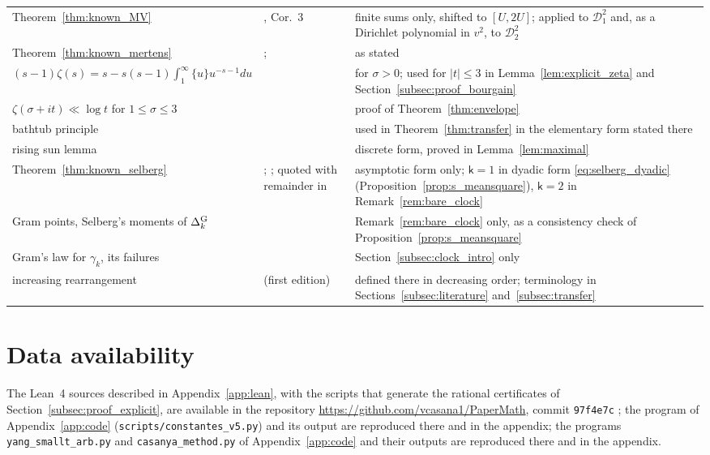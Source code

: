 \documentclass[11pt,a4paper]{article}
\makeatletter
\numberwithin{equation}{section}
\DeclareRobustCommand{\CGref}[1]{\ref{#1}}
\DeclareRobustCommand{\CGeqref}[1]{\eqref{#1}}
\DeclareRobustCommand{\CGcite}[2][]{\if\relax\detokenize{#1}\relax\cite{#2}\else\cite[#1]{#2}\fi}
\let\CG@origref\ref
\let\CG@origeqref\eqref
\newcommand{\CG@gettip}[1]{\@ifundefined{CGTip@#1}{#1}{\csname CGTip@#1\endcsname}}
\newcommand{\CG@getbib}[1]{\@ifundefined{CGBib@#1}{#1}{\csname CGBib@#1\endcsname}}
\DeclareRobustCommand{\CGref}[1]{\pdftooltip{\CG@origref{#1}}{\CG@gettip{#1}}}
\DeclareRobustCommand{\CGeqref}[1]{\pdftooltip{\CG@origeqref{#1}}{\CG@gettip{#1}}}
\DeclareRobustCommand{\CGcite}[2][]{\pdftooltip{\if\relax\detokenize{#1}\relax\cite{#2}\else\cite[#1]{#2}\fi}{\CG@getbib{#2}}}
\theoremstyle{definition}
\theoremstyle{remark}
\makeatother
\begin{document}
\begin{center}
\begin{longtable}{p{}p{}p{}}
Theorem~\CGref{thm:known_MV} & \CGcite{MontgomeryVaughan1974}, Cor.~3 & finite sums only, shifted to $[U,2U]$; applied to $\mathscr D_1^2$ and, as a Dirichlet polynomial in $v^2$, to $\mathscr D_2^2$\\
Theorem~\CGref{thm:known_mertens} & \CGcite{Mertens1874}; \CGcite[Ch.~I.1]{Tenenbaum2015} & as stated\\
$(s-1)\zeta(s)=s-s(s-1)\int_1^\infty\{u\}u^{-s-1}du$ & \CGcite[(2.1.4)]{Titchmarsh1986} & for $\sigma>0$; used for $|t|\le3$ in Lemma~\CGref{lem:explicit_zeta} and Section~\CGref{subsec:proof_bourgain}\\
$\zeta(\sigma+it)\ll\log t$ for $1\le\sigma\le3$ & \CGcite[Thm.~3.5]{Titchmarsh1986} & proof of Theorem~\CGref{thm:envelope}\\
bathtub principle & \CGcite[Thm.~1.14]{LiebLoss2001} & used in Theorem~\CGref{thm:transfer} in the elementary form stated there\\
rising sun lemma & \CGcite{Riesz1932} & discrete form, proved in Lemma~\CGref{lem:maximal}\\
Theorem~\CGref{thm:known_selberg} & \CGcite{Selberg1946a}; \CGcite[Notes for Chapter~9, (9.25.1), p.~245]{Titchmarsh1986}; quoted with remainder in \CGcite[p.~225]{Fujii1974} & asymptotic form only; $\mathsf k=1$ in dyadic form \CGeqref{eq:selberg_dyadic} (Proposition~\CGref{prop:s_meansquare}), $\mathsf k=2$ in Remark~\CGref{rem:bare_clock}\\
Gram points, Selberg's moments of $\Delta^{\rm G}_k$ & \CGcite[Thm.~4.2]{Korolev2012} & Remark~\CGref{rem:bare_clock} only, as a consistency check of Proposition~\CGref{prop:s_meansquare}\\
Gram's law for $\gamma_k$, its failures & \CGcite[Def.~1.4 and p.~58]{Korolev2012} & Section~\CGref{subsec:clock_intro} only\\
increasing rearrangement & \CGcite[\S10.12, pp.~276--278]{HardyLittlewoodPolya1934} (first edition) & defined there in decreasing order; terminology in Sections~\CGref{subsec:literature} and~\CGref{subsec:transfer}\\
\end{longtable}
\end{center}

\section*{Data availability}
The Lean~4 sources described in Appendix~\CGref{app:lean}, with the scripts that generate the rational certificates of Section~\CGref{subsec:proof_explicit}, are available in the repository \url{https://github.com/vcasana1/PaperMath}, commit \texttt{97f4e7c} \CGcite{CasanaPaperMath2026}; the program of Appendix~\CGref{app:code} (\texttt{scripts/constantes\_v5.py}) and its output are reproduced there and in the appendix; the programs \texttt{yang\_smallt\_arb.py} and \texttt{casanya\_method.py} of Appendix~\CGref{app:code} and their outputs are reproduced there and in the appendix.
\end{document}

